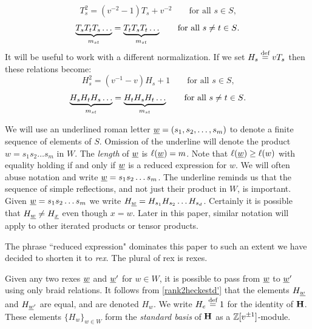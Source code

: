 \begin{equation} T_s^2= (v^{-2}-1) T_s  + v^{-2} \label{rank1heckestd} \qquad \text{for all $s \in S$,}\end{equation}
\begin{equation} \underbrace{T_sT_tT_s\ldots}_{m_{st}} = \underbrace{T_tT_sT_t\ldots}_{m_{st}} \label{rank2heckestd} 
\qquad \text{for all $s \ne t \in S$.}
\end{equation}
It will be useful to work with a different normalization. If we set $H_s \stackrel{\mbox{\scriptsize{def}}}{=} vT_s$ then these relations become:
\begin{equation} H_s^2= (v^{-1}-v)H_s + 1 \label{rank1heckestd'} \qquad \text{for all $s \in S$,}\end{equation}
\begin{equation} \underbrace{H_sH_tH_s\ldots}_{m_{st}} = \underbrace{H_tH_sH_t\ldots}_{m_{st}} \label{rank2heckestd'} 
\qquad \text{for all $s \ne t \in S$.}
\end{equation}

\begin{notation} 
We will use an underlined roman letter $\underline{w} = (s_1,s_2, \dots, s_m)$ to denote a finite sequence of elements of $S$. Omission of the underline will denote the product $w=s_1s_2 \dots s_m$ in $W$. The \emph{length} of $\underline{w}$ is $\ell(\underline{w}) = m$. Note that $\ell(\underline{w}) \ge \ell(w)$ with equality holding if and only if $\underline{w}$ is a reduced expression for $w$. We will often abuse notation and write $\underline{w} = s_1 s_2  \dots s_m$. The underline reminds us that the sequence of simple reflections, and not just their product in $W$, is important. Given $\underline{w} = s_1 s_2  \dots s_m$ we write $H_{\underline{w}} = H_{s_1}H_{s_2} \dots H_{s_d}$. Certainly it is possible that $H_{\underline{w}} \ne H_{\underline{x}}$ even though $x = w$. Later in this paper, similar notation will apply to other iterated products or tensor products.
\end{notation}

\begin{notation} The phrase ``reduced expression" dominates this paper to such an extent we have decided to shorten it to \emph{rex}. The plural of rex is rexes. \end{notation}

Given any two rexes $\underline{w}$ and $\underline{w}'$ for $w \in W$, it is possible to pass from $\underline{w}$ to $\underline{w}'$ using only braid relations. It follows from \eqref{rank2heckestd'} that the elements $H_{\underline{w}}$ and $H_{\underline{w}'}$ are equal, and are denoted $H_w$. We write $H_e \stackrel{\mbox{\scriptsize{def}}}{=} 1$ for the identity of ${\mathbf H}$. These elements $\{H_w\}_{w
\in W}$ form the \emph{standard basis} of ${\mathbf H}$ as a ${\mathbb{Z}}[v^{\pm 1}]$-module.

